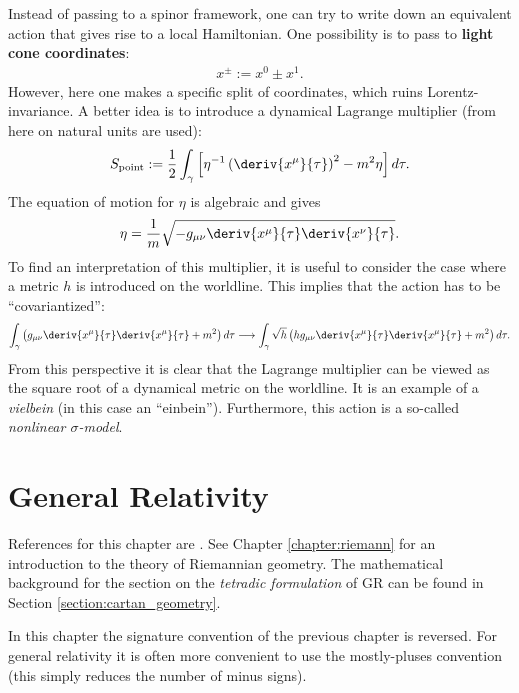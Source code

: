     Instead of passing to a spinor framework, one can try to write down an equivalent action that gives rise to a local Hamiltonian. One possibility is to pass to \textbf{light cone coordinates}:
    \begin{gather}
        x^\pm := x^0\pm x^1.
    \end{gather}
    However, here one makes a specific split of coordinates, which ruins Lorentz-invariance. A better idea is to introduce a dynamical Lagrange multiplier (from here on natural units are used):
    \begin{gather}
        S_\mathrm{point} := \frac{1}{2}\int_\gamma\left[\eta^{-1}\left(\deriv{x^\mu}{\tau}\right)^2-m^2\eta\right]d\tau.
    \end{gather}
    The equation of motion for $\eta$ is algebraic and gives
    \begin{gather}
        \eta = \frac{1}{m}\sqrt{-g_{\mu\nu}\deriv{x^\mu}{\tau}\deriv{x^\nu}{\tau}}.
    \end{gather}
    To find an interpretation of this multiplier, it is useful to consider the case where a metric $h$ is introduced on the worldline. This implies that the action has to be ``covariantized'':
    \begin{gather}
        \int_\gamma\left(g_{\mu\nu}\deriv{x^\mu}{\tau}\deriv{x^\mu}{\tau}+m^2\right)d\tau\longrightarrow\int_\gamma\sqrt{h}\left(hg_{\mu\nu}\deriv{x^\mu}{\tau}\deriv{x^\mu}{\tau}+m^2\right)d\tau.
    \end{gather}
    From this perspective it is clear that the Lagrange multiplier can be viewed as the square root of a dynamical metric on the worldline. It is an example of a \textit{vielbein} (in this case an ``einbein''). Furthermore, this action is a so-called \textit{nonlinear $\sigma$-model}.


\chapter{General Relativity}\label{chapter:GR}

    References for this chapter are \cite{gravitation, lqg}. See Chapter \ref{chapter:riemann} for an introduction to the theory of Riemannian geometry. The mathematical background for the section on the \textit{tetradic formulation} of GR can be found in Section \ref{section:cartan_geometry}.

    In this chapter the signature convention of the previous chapter is reversed. For general relativity it is often more convenient to use the mostly-pluses convention (this simply reduces the number of minus signs).

